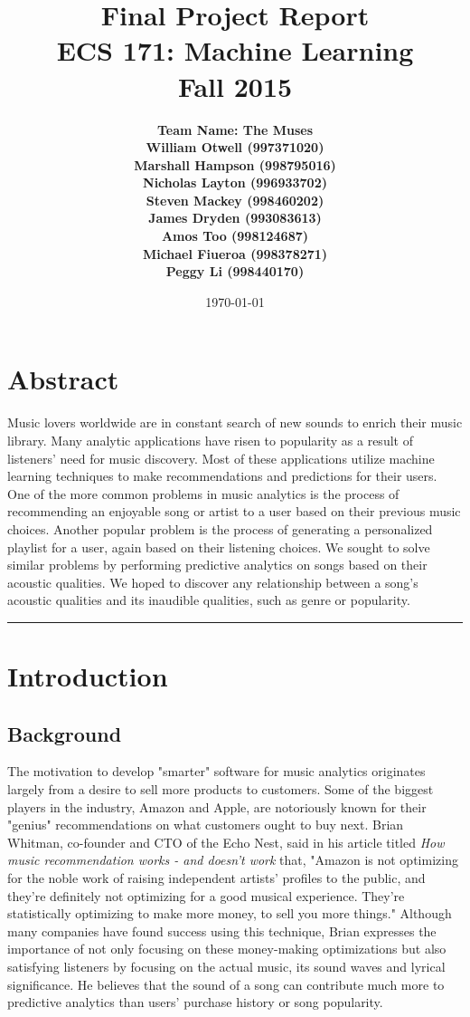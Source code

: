 \documentclass[12pt]{article}
\title{\vspace{-3ex}\bf Final Project Report\\[2ex] 
       \normalsize ECS 171: Machine Learning\\Fall 2015}
\date{\today}
\author{\bf Team Name: The Muses\\ \bf William Otwell (997371020)\\ \bf Marshall Hampson (998795016)\\ \bf Nicholas Layton (996933702)\\ \bf Steven Mackey (998460202)\\ \bf James Dryden (993083613)\\ \bf Amos Too (998124687)\\ \bf Michael Fiueroa (998378271)\\ \bf Peggy Li (998440170)}
\newcommand{\horizontalLine}{
	\begin{center}
		\hrule width 1.0\textwidth
	\end{center}
}
\begin{document}
\maketitle
\pagebreak
\tableofcontents
\pagebreak
\section{Abstract}
\label{sec:abstract}
Music lovers worldwide are in constant search of new sounds to enrich their music library. Many analytic applications have risen to popularity as a result of listeners' need for music discovery. Most of these applications utilize machine learning techniques to make recommendations and predictions for their users. One of the more common problems in music analytics is the process of recommending an enjoyable song or artist to a user based on their previous music choices. Another popular problem is the process of generating a personalized playlist for a user, again based on their listening choices. We sought to solve similar problems by performing predictive analytics on songs based on their acoustic qualities. We hoped to discover any relationship between a song's acoustic qualities and its inaudible qualities, such as genre or popularity. 
\horizontalLine
\section{Introduction}
\label{sec:introduction}
\subsection{Background}
\label{subsec:background}
The motivation to develop "smarter" software for music analytics originates largely from a desire to sell more products to customers. Some of the biggest players in the industry, Amazon and Apple, are notoriously known for their "genius" recommendations on what customers ought to buy next. Brian Whitman, co-founder and CTO of the Echo Nest, said in his article titled \textit{How music recommendation works - and doesn't work} that, "Amazon is not optimizing for the noble work of raising independent artists' profiles to the public, and they're definitely not optimizing for a good musical experience. They're statistically optimizing to make more money, to sell you more things." Although many companies have found success using this technique, Brian expresses the importance of not only focusing on these money-making optimizations but also satisfying listeners by focusing on the actual music, its sound waves and lyrical significance. He believes that the sound of a song can contribute much more to predictive analytics than users' purchase history or song popularity.
\end{document}
